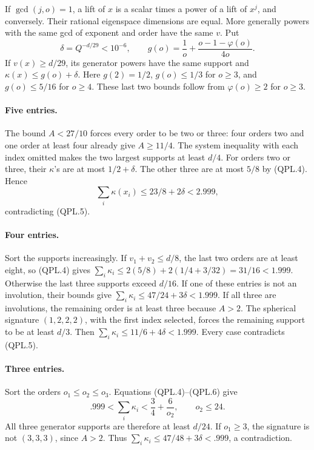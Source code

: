 If \(\gcd(j,o)=1\), a lift of \(x\) is a scalar times a
power of a lift of \(x^j\), and conversely. Their rational
eigenspace dimensions are equal. More generally powers with
the same gcd of exponent and order have the same \(v\).
Put
\[
 \delta=Q^{-d/29}<10^{-6},\qquad
 g(o)=\frac1o+\frac{o-1-\varphi(o)}{4o}.
 \tag{QPL.9}
\]
If \(v(x)\ge d/29\), its generator powers have the same
support and
\(\kappa(x)\le g(o)+\delta\).
Here \(g(2)=1/2\), \(g(o)\le1/3\) for \(o\ge3\), and
\(g(o)\le5/16\) for \(o\ge4\).
These last two bounds follow from \(\varphi(o)\ge2\)
for \(o\ge3\).

\paragraph{Five entries.}
The bound \(A<27/10\) forces every order to be two or three:
four orders two and one order at least four already give
\(A\ge11/4\).
The system inequality with each index omitted makes the
two largest supports at least \(d/4\). For orders two or
three, their \(\kappa\)'s are at most \(1/2+\delta\).
The other three are at most \(5/8\) by (QPL.4). Hence
\[
                    \sum_i\kappa(x_i)\le23/8+2\delta<2.999,
 \tag{QPL.10}
\]
contradicting (QPL.5).

\paragraph{Four entries.}
Sort the supports increasingly. If \(v_1+v_2\le d/8\),
the last two orders are at least eight, so (QPL.4) gives
\(\sum_i\kappa_i\le2(5/8)+2(1/4+3/32)=31/16<1.999\).
Otherwise the last three supports exceed \(d/16\).
If one of these entries is not an involution, their bounds
give \(\sum_i\kappa_i\le47/24+3\delta<1.999\).
If all three are involutions, the remaining order is at
least three because \(A>2\). The spherical signature
\((1,2,2,2)\), with the first index selected, forces the
remaining support to be at least \(d/3\). Then
\(\sum_i\kappa_i\le11/6+4\delta<1.999\).
Every case contradicts (QPL.5).

\paragraph{Three entries.}
Sort the orders \(o_1\le o_2\le o_3\).
Equations (QPL.4)--(QPL.6) give
\[
 .999<\sum_i\kappa_i<\frac34+\frac6{o_2},
               \qquad o_2\le24.
 \tag{QPL.11}
\]
All three generator supports are therefore at least \(d/24\).
If \(o_1\ge3\), the signature is not \((3,3,3)\), since
\(A>2\). Thus
\(\sum_i\kappa_i\le47/48+3\delta<.999\), a contradiction.

